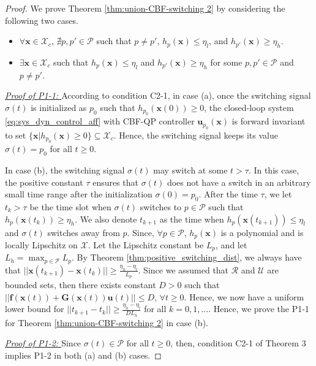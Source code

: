 \documentclass[letterpaper, 10 pt, conference]{ieeeconf}  %
\begin{document}
\begin{proof}
    We prove Theorem \ref{thm:union-CBF-switching 2} by considering the following two cases.
    \begin{itemize}
        \item [(a)]$\forall \mathbf{x}\in\mathcal{X}_c$, $\nexists p, p'\in\mathcal{P}$ such that $p\neq p'$, $h_p(\mathbf{x})\leq \eta_l$, and $h_{p'}(\mathbf{x})\geq \eta_h$.
        \item [(b)]$\exists \mathbf{x}\in\mathcal{X}_c$ such that $h_p(\mathbf{x})\leq \eta_l$ and $h_{p'}(\mathbf{x})\geq \eta_h$ for some $p, p'\in\mathcal{P}$ and $p \neq p'$. 
    \end{itemize}
    
    \textit{\underline{Proof of P1-1: }}
    According to condition C2-1, in case (a), once the switching signal $\sigma(t)$ is initialized as $p_0$ such that $h_{p_0}(\mathbf{x}(0))\geq0$, the closed-loop system \eqref{eq:sys_dyn_control_aff} with CBF-QP controller $\mathbf{u}_{p_0}(\mathbf{x})$ is forward invariant to set $\{\mathbf{x}|h_{p_0}(\mathbf{x})\geq 0\}\subseteq\mathcal{X}_c$. Hence, the switching signal keeps its value $\sigma(t)=p_0$ for all $t\geq 0$. 
    
    In case (b), the switching signal $\sigma(t)$ may switch at some $t > \tau$. In this case, the positive constant $\tau$ ensures that $\sigma(t)$ does not have a switch in an arbitrary small time range after the initialization $\sigma(0)=p_0$. After the time $\tau$, we let $t_{k} >\tau$ be the time slot when $\sigma(t)$ switches to $p\in\mathcal{P}$ such that $h_p(\mathbf{x}(t_k))\geq\eta_h$. We also denote $t_{k+1}$ as the time when $h_p(\mathbf{x}(t_{k+1}))\leq \eta_l$ and $\sigma(t)$ switches away from $p$. Since, $\forall p\in\mathcal{P}$, $h_p(\mathbf{x})$ is a polynomial and is locally Lipschitz on $\mathcal{X}$. Let the Lipschitz constant be $L_p$, and let $L_h = \max_{p\in\mathcal{P}}L_p$. By Theorem \ref{thm:positive_switching_dist}, we always have that $||\mathbf{x}(t_{k+1}) - \mathbf{x}(t_k)|| \geq \frac{\eta_h - \eta_l}{L_p}$. Since we assumed that $\mathcal{R}$ and $\mathcal{U}$ are bounded sets, then there exists constant $D>0$ such that $||\mathbf{f}(\mathbf{x}(t)) + \mathbf{G}(\mathbf{x}(t))\mathbf{u}(t)|| \leq D$, $\forall t\geq 0$. Hence, we now have a uniform lower bound for $||t_{k+1}-t_k||\geq \frac{\eta_h - \eta_l}{DL_h}$ for all $k=0,1,...$. Hence, we prove the P1-1 for Theorem \ref{thm:union-CBF-switching 2} in case (b). 
    
    \textit{\underline{Proof of P1-2: }}
    Since $\sigma(t)\in\mathcal{P}$ for all $t\geq 0$, then, condition C2-1 of Theorem 3 implies P1-2 in both (a) and (b) cases.
\end{proof}  
\end{document}
